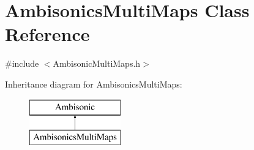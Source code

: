 \hypertarget{class_ambisonics_multi_maps}{\section{Ambisonics\-Multi\-Maps Class Reference}
\label{class_ambisonics_multi_maps}
}


{\ttfamily \#include $<$Ambisonic\-Multi\-Maps.\-h$>$}

Inheritance diagram for Ambisonics\-Multi\-Maps\-:\begin{figure}[H]
\begin{center}
\leavevmode
\includegraphics[height=2.000000cm]{class_ambisonics_multi_maps}
\end{center}
\end{figure}
